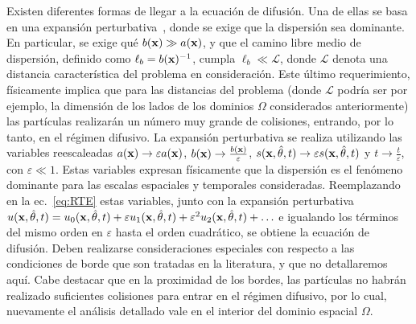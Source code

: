 Existen diferentes formas 
de llegar a la ecuación de difusión. Una de ellas se basa en  una expansión perturbativa~\cite{Larsen1974,Larsen1987,Arridge2009}, 
donde se exige que la dispersión sea dominante. En particular, se exige qué $b(\mathbf{x}) \gg a(\mathbf{x})$, 
y que el camino libre medio de dispersión, definido como $\ell_b=b(\mathbf{x})^{-1}$, cumpla $\ell_b\ll \mathcal{L}$, 
donde $\mathcal{L}$ denota una distancia característica del problema en consideración. 
Este último requerimiento, físicamente implica que para las distancias del problema (donde $\mathcal{L}$ 
podría ser por ejemplo, la dimensión de los lados de los dominios $\Omega$ considerados anteriormente) las partículas realizarán un número muy grande de colisiones, entrando, por lo tanto, en el régimen difusivo. La expansión perturbativa se realiza utilizando las variables 
reescaleadas $a(\mathbf{x}) \rightarrow \varepsilon a(\mathbf{x})$, $b(\mathbf{x}) \rightarrow \frac{b(\mathbf{x})}{\varepsilon}$, $s(\mathbf{x},\hat{\theta},t)\rightarrow  \varepsilon s(\mathbf{x},\hat{\theta},t)$ y $t\rightarrow \frac{t}{\varepsilon}$, con $\varepsilon \ll 1$. Estas variables  expresan físicamente que la dispersión es el fenómeno dominante para las 
escalas espaciales y temporales consideradas. Reemplazando en la ec.~\eqref{eq:RTE} estas variables, junto con la expansión perturbativa $u(\mathbf{x},\hat{\theta},t)=u_0(\mathbf{x},\hat{\theta},t)+\varepsilon u_1(\mathbf{x},\hat{\theta},t)+\varepsilon^2 u_2(\mathbf{x},\hat{\theta},t)+\ldots$ e igualando los términos del mismo orden en $\varepsilon$ 
hasta el orden cuadrático, se obtiene la ecuación de difusión. Deben realizarse consideraciones especiales con respecto a las condiciones de 
borde que son tratadas en la literatura, y que no detallaremos aquí. Cabe destacar que en la proximidad de los bordes, las partículas no habrán realizado suficientes colisiones para entrar en el régimen difusivo, por lo cual, nuevamente el análisis detallado vale en el interior del dominio espacial $\Omega$. 

